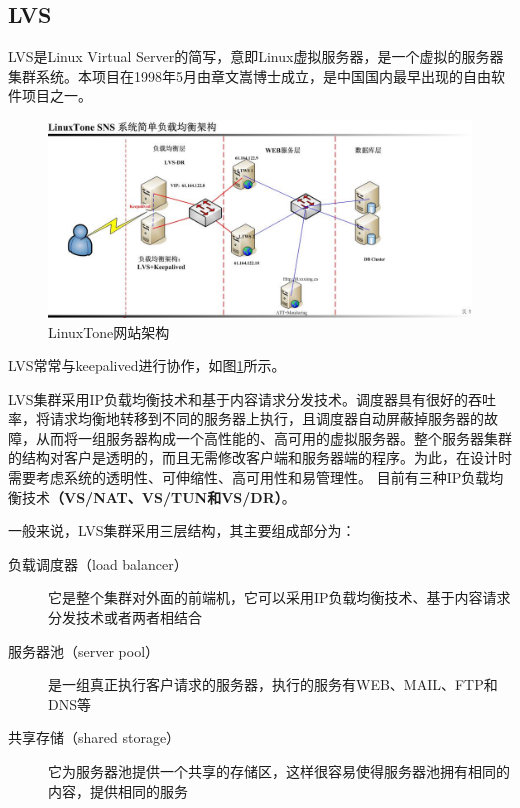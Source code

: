 \subsection{LVS}
LVS是Linux Virtual Server的简写，意即Linux虚拟服务器，是一个虚拟的服务器集群系统。本项目在1998年5月由章文嵩博士成立，是中国国内最早出现的自由软件项目之一。

\begin{figure}[ht]
	\begin{center}
		\includegraphics[keepaspectratio,width=0.5\paperwidth]{Pictures/Network/LinuxToneSnsArch.jpg}
	\caption{LinuxTone网站架构}
	\label{fig:LinuxToneSnsArch}
	\end{center}
\end{figure}

LVS常常与keepalived进行协作，如图\ref{fig:LinuxToneSnsArch}所示。


LVS集群采用IP负载均衡技术和基于内容请求分发技术。调度器具有很好的吞吐率，将请求均衡地转移到不同的服务器上执行，且调度器自动屏蔽掉服务器的故障，从而将一组服务器构成一个高性能的、高可用的虚拟服务器。整个服务器集群的结构对客户是透明的，而且无需修改客户端和服务器端的程序。为此，在设计时需要考虑系统的透明性、可伸缩性、高可用性和易管理性。
目前有三种IP负载均衡技术\textbf{（VS/NAT、VS/TUN和VS/DR）}。

一般来说，LVS集群采用三层结构，其主要组成部分为：
\begin{description}
\item[负载调度器（load balancer）] 它是整个集群对外面的前端机，它可以采用IP负载均衡技术、基于内容请求分发技术或者两者相结合
\item[服务器池（server pool）] 是一组真正执行客户请求的服务器，执行的服务有WEB、MAIL、FTP和DNS等
\item[共享存储（shared storage）] 它为服务器池提供一个共享的存储区，这样很容易使得服务器池拥有相同的内容，提供相同的服务
\end{description}


